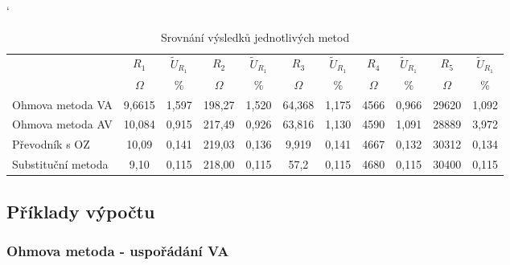 \documentclass[a4paper, czech]{article}
\begin{document}
\begin{table}[H]
    \catcode`
    \centering
    \caption{Srovnání výsledků jednotlivých metod}
    \begin{tabular}{lcccccccccc}
        \toprule
        \multirow{2}{*}{}    & $R_1$     & $\tilde{U}_{R_1}$ & $R_2$      & $\tilde{U}_{R_1}$ & $R_3$     & $\tilde{U}_{R_1}$ & $R_4$       & $\tilde{U}_{R_1}$ & $R_5$    & $\tilde{U}_{R_1}$ \\
        \cmidrule(rl){2-3}
        \cmidrule(rl){4-5}
        \cmidrule(rl){6-7}
        \cmidrule(rl){8-9}
        \cmidrule(rl){10-11}
                            & $\Omega$      & \%    & $\Omega$       & \%    & $\Omega$      & \%    & $\Omega$        & \%    & $\Omega$     & \%    \\
        \midrule
        Ohmova   metoda VA   & 9,6615 & 1,597 & 198,27 & 1,520 & 64,368 & 1,175 & 4566 & 0,966 & 29620 & 1,092 \\
        Ohmova   metoda AV   & 10,084 & 0,915 & 217,49  & 0,926 & 63,816 & 1,130 & 4590   & 1,091 & 28889 & 3,972 \\
        Převodník   s OZ     & 10,09  & 0,141 & 219,03  & 0,136 & 9,919  & 0,141 & 4667     & 0,132 & 30312 & 0,134 \\
        Substituční   metoda & 9,10    & 0,115 & 218,00     & 0,115 & 57,2   & 0,115 & 4680     & 0,115 & 30400 & 0,115 \\
        \bottomrule
    \end{tabular}
\end{table}

\subsection{Příklady výpočtu}

\subsubsection{Ohmova metoda - uspořádání VA}
\end{document}
